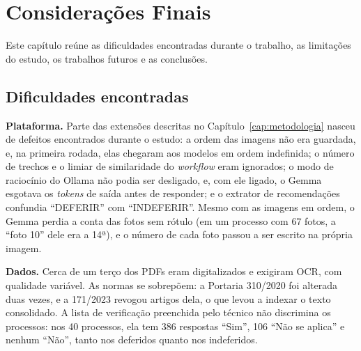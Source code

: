 \chapter{Considerações Finais}
\label{cap:consideracoes}

Este capítulo reúne as dificuldades encontradas durante o trabalho, as limitações do estudo, os trabalhos futuros e as conclusões.

\section{Dificuldades encontradas}
\label{sec:dificuldades}

\textbf{Plataforma.} Parte das extensões descritas no Capítulo~\ref{cap:metodologia} nasceu de defeitos encontrados durante o estudo: a ordem das imagens não era guardada, e, na primeira rodada, elas chegaram aos modelos em ordem indefinida; o número de trechos e o limiar de similaridade do \textit{workflow} eram ignorados; o modo de raciocínio do Ollama não podia ser desligado, e, com ele ligado, o Gemma esgotava os \textit{tokens} de saída antes de responder; e o extrator de recomendações confundia ``DEFERIR'' com ``INDEFERIR''. Mesmo com as imagens em ordem, o Gemma perdia a conta das fotos sem rótulo (em um processo com 67 fotos, a ``foto 10'' dele era a 14ª), e o número de cada foto passou a ser escrito na própria imagem.

\textbf{Dados.} Cerca de um terço dos PDFs eram digitalizados e exigiram OCR, com qualidade variável. As normas se sobrepõem: a Portaria 310/2020 foi alterada duas vezes, e a 171/2023 revogou artigos dela, o que levou a indexar o texto consolidado. A lista de verificação preenchida pelo técnico não discrimina os processos: nos 40 processos, ela tem 386 respostas ``Sim'', 106 ``Não se aplica'' e nenhum ``Não'', tanto nos deferidos quanto nos indeferidos.

